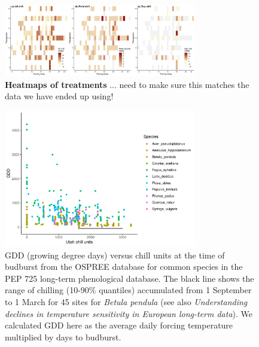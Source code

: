 \documentclass{article}
\begin{document}
\newpage
\begin{figure}[h!]
\centering
\noindent \includegraphics[width=0.75\textwidth]{..//..//analyses/bb_analysis/figures/studydesign_heat3panel.pdf}
\caption{\textbf{Heatmaps of treatments} ... need to make sure this matches the data we have ended up using!}
\label{fig:treatheatmaps} %
\end{figure}



\newpage
\begin{figure}[h!]
\centering
\noindent \includegraphics[width=0.75\textwidth]{..//..//analyses/bb_analysis/figures/gddbyutah_pepspp.pdf}
\caption{GDD (growing degree days) versus chill units at the time of budburst from the OSPREE database for common species in the PEP 725 long-term phenological database. The black line shows the range of chilling (10-90\% quantiles) accumulated from 1 September to 1 March for 45 sites for \emph{Betula pendula} (see also \emph{Understanding declines in temperature sensitivity in European long-term data}). We calculated GDD  here as the average daily forcing temperature multiplied by days to budburst. }
\label{fig:pepgddchill}
\end{figure}



\end{document}
